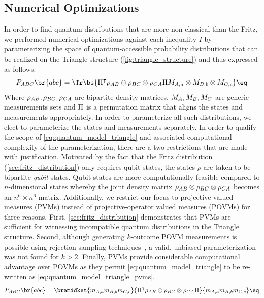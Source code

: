 \documentclass[aps, 10pt, english, twoside, pra, nofootinbib, tightenlines, longbibliography, superscriptaddress]{revtex4-1}
\begin{document}
    \subsection{Numerical Optimizations}
    \label{sec:optimizations}

    In order to find quantum distributions that are more non-classical than the Fritz, we performed numerical optimizations against each inequality $I$ by parameterizing the space of quantum-accessible probability distributions that can be realized on the Triangle structure (\cref{fig:triangle_structure}) and thus expressed as follows:
    \[ \prob[\p{ABC}]\br{abc} = \Tr\bs{\netperm^\intercal \rho_{\p{AB}}\otimes\rho_{\p{BC}}\otimes\rho_{\p{CA}} \netperm M_{\p{A},a}\otimes M_{\p{B},b} \otimes M_{\p{C},c}} \eq \label{eq:quantum_model_triangle}\]
    Where $\rho_{AB}, \rho_{BC}, \rho_{CA}$ are bipartite density matrices, $M_{A}, M_{B}, M_{C}$ are generic measurements sets and $\Pi$ is a permutation matrix that aligns the states and measurements appropriately. In order to parameterize all such distributions, we elect to parameterize the states and measurements separately. In order to qualify the scope of \cref{eq:quantum_model_triangle} and associated computational complexity of the parameterization, there are a two restrictions that are made with justification. Motivated by the fact that the Fritz distribution (\cref{sec:fritz_distribution}) only requires qubit states, the states $\rho$ are taken to be bipartite \textit{qubit} states. Qubit states are more computationally feasible compared to $n$-dimensional states whereby the joint density matrix $\rho_{AB}\otimes\rho_{BC}\otimes\rho_{CA}$ becomes an $n^6 \times n^6$ matrix. Additionally, we restrict our focus to projective-valued measures (PVMs) instead of projective-operator valued measures (POVMs) for three reasons. First, \cref{sec:fritz_distribution} demonstrates that PVMs are sufficient for witnessing incompatible quantum distributions in the Triangle structure. Second, although generating $k$-outcome POVM measurements is possible using rejection sampling techniques~\cite{Petz_2015}, a valid, unbiased parameterization was not found for $k > 2$. Finally, PVMs provide considerable computational advantage over POVMs as they permit \cref{eq:quantum_model_triangle} to be re-written as \cref{eq:quantum_model_triangle_pvms}.
    \[ \prob[\p{ABC}]\br{abc} = \bramidket{m_{\p{A},a}m_{\p{B},b}m_{\p{C},c}}{\netperm^\intercal \rho_{AB}\otimes\rho_{BC}\otimes\rho_{CA} \netperm}{m_{\p{A},a}m_{\p{B},b}m_{\p{C},c}} \eq \label{eq:quantum_model_triangle_pvms}\]
\end{document}

